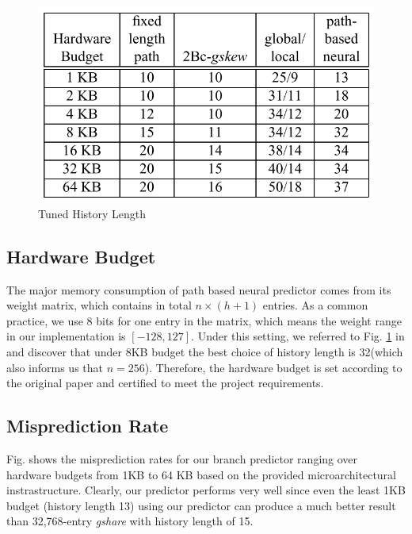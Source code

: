 \documentclass[conference]{IEEEtran}
\begin{document}
\begin{figure}[htbp]
\begin{center}
\includegraphics[width=\linewidth]{history_length.png} 
\end{center}	   
\caption{Tuned History Length}\label{history_length}
\end{figure}

\subsection{Hardware Budget}
The major memory consumption of path based neural predictor comes from its weight matrix, which contains in total $n\times (h+1)$ entries. As a common practice, we use 8 bits for one entry in the matrix, which means the weight range in our implementation is $[-128, 127]$. Under this setting, we referred to Fig. \ref{history_length} in \cite{jimenez2003fast} and discover that under 8KB budget the best choice of history length is 32(which also informs us that $n=256$). Therefore, the hardware budget is set according to the original paper and certified to meet the project requirements.

\subsection{Misprediction Rate}
Fig. shows the misprediction rates for our branch predictor ranging over hardware budgets from 1KB to 64 KB based on the provided microarchitectural instrastructure. Clearly, our predictor performs very well since even the least 1KB budget (history length 13) using our predictor can produce a much better result than 32,768-entry \emph{gshare} with history length of 15.
\end{document}

